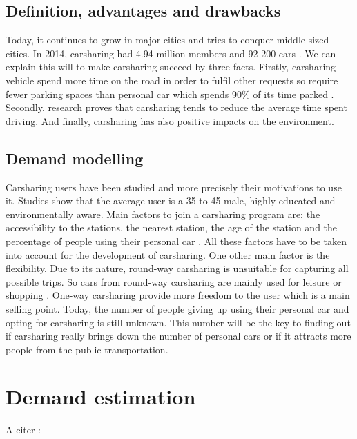 \begin{bibunit}[ieeetr]
\subsection{Definition, advantages and drawbacks}
Today, it continues to grow in major cities and tries to conquer middle sized cities.
In 2014, carsharing had 4.94 million members and 92 200 cars \cite{frost_strategic_2014}.
We can explain this will to make carsharing succeed by three facts.
Firstly, carsharing vehicle spend more time on the road in order to fulfil other requests so require fewer parking spaces \cite{mitchell_reinventing_2010} than personal car which spends 90\% of its time parked \cite{hu_summary_2004}.
Secondly, research \cite{sioui_carsharing_2013} proves that carsharing tends to reduce the average time spent driving.
And finally, carsharing has also positive impacts on the environment.

\subsection{Demand modelling}
Carsharing users have been studied and more precisely their motivations to use it.
Studies show that the average user is a 35 to 45 male, highly educated and environmentally aware.
Main factors to join a carsharing program are: the accessibility to the stations, the nearest station, the age of the station and the percentage of people using their personal car \cite{jorge_carsharing_2013}.
All these factors have to be taken into account for the development of carsharing.
One other main factor is the flexibility.
Due to its nature, round-way carsharing is unsuitable for capturing all possible trips.
So cars from round-way carsharing are mainly used for leisure or shopping \cite{barth_shared_use_2002, costain_synopsis_2012}.
One-way carsharing provide more freedom to the user which is a main selling point.
Today, the number of people giving up using their personal car and opting for carsharing is still unknown.
This number will be the key to finding out if carsharing really brings down the number of personal cars or if it attracts more people from the public transportation.


\newpage
\section{Demand estimation}

A citer :\\
\cite{modele_deplacement_dreif_2008}\\
\cite{danielis_potential_2015}\\



\end{bibunit}
